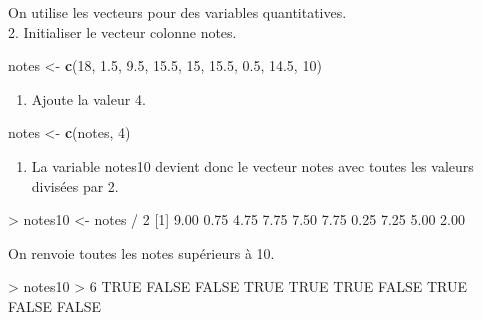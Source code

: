 \documentclass[
]{article}
\newenvironment{Shaded}{}{}
\newcommand{\DecValTok}[1]{\textcolor[rgb]{0.25,0.63,0.44}{#1}}
\newcommand{\FloatTok}[1]{\textcolor[rgb]{0.25,0.63,0.44}{#1}}
\newcommand{\KeywordTok}[1]{\textcolor[rgb]{0.00,0.44,0.13}{\textbf{#1}}}
\newcommand{\NormalTok}[1]{#1}
\newcommand{\OperatorTok}[1]{\textcolor[rgb]{0.40,0.40,0.40}{#1}}
\newcommand{\OtherTok}[1]{\textcolor[rgb]{0.00,0.44,0.13}{#1}}
\newcommand{\StringTok}[1]{\textcolor[rgb]{0.25,0.44,0.63}{#1}}
\providecommand{\tightlist}{%
  \setlength{\itemsep}{0pt}\setlength{\parskip}{0pt}}
\begin{document}
On utilise les vecteurs pour des variables quantitatives.\\
2. Initialiser le vecteur colonne notes.

\begin{Shaded}
\begin{Highlighting}[]
\NormalTok{notes \textless{}{-}}\StringTok{ }\KeywordTok{c}\NormalTok{(}\DecValTok{18}\NormalTok{, }\FloatTok{1.5}\NormalTok{, }\FloatTok{9.5}\NormalTok{, }\FloatTok{15.5}\NormalTok{, }\DecValTok{15}\NormalTok{, }\FloatTok{15.5}\NormalTok{, }\FloatTok{0.5}\NormalTok{, }\FloatTok{14.5}\NormalTok{, }\DecValTok{10}\NormalTok{)}
\end{Highlighting}
\end{Shaded}

\begin{enumerate}
\def\labelenumi{\arabic{enumi}.}
\setcounter{enumi}{2}
\tightlist
\item
  Ajoute la valeur 4.\\
\end{enumerate}

\begin{Shaded}
\begin{Highlighting}[]
\NormalTok{notes \textless{}{-}}\StringTok{ }\KeywordTok{c}\NormalTok{(notes, }\DecValTok{4}\NormalTok{)}
\end{Highlighting}
\end{Shaded}

\begin{enumerate}
\def\labelenumi{\arabic{enumi}.}
\setcounter{enumi}{3}
\tightlist
\item
  La variable notes10 devient donc le vecteur notes avec toutes les
  valeurs divisées par 2.\\
\end{enumerate}

\begin{Shaded}
\begin{Highlighting}[]
 \OperatorTok{\textgreater{}}\StringTok{ }\NormalTok{notes10 \textless{}{-}}\StringTok{ }\NormalTok{notes }\OperatorTok{/}\StringTok{ }\DecValTok{2}
\NormalTok{[}\DecValTok{1}\NormalTok{] }\FloatTok{9.00} \FloatTok{0.75} \FloatTok{4.75} \FloatTok{7.75} \FloatTok{7.50} \FloatTok{7.75} \FloatTok{0.25} \FloatTok{7.25} \FloatTok{5.00} \FloatTok{2.00}  
\end{Highlighting}
\end{Shaded}

On renvoie toutes les notes supérieurs à 10.

\begin{Shaded}
\begin{Highlighting}[]
 \OperatorTok{\textgreater{}}\StringTok{ }\NormalTok{notes10 }\OperatorTok{\textgreater{}}\StringTok{ }\DecValTok{6}  
\OtherTok{TRUE} \OtherTok{FALSE} \OtherTok{FALSE}  \OtherTok{TRUE}  \OtherTok{TRUE}  \OtherTok{TRUE} \OtherTok{FALSE}  \OtherTok{TRUE} \OtherTok{FALSE} \OtherTok{FALSE}
\end{Highlighting}
\end{Shaded}
\end{document}
